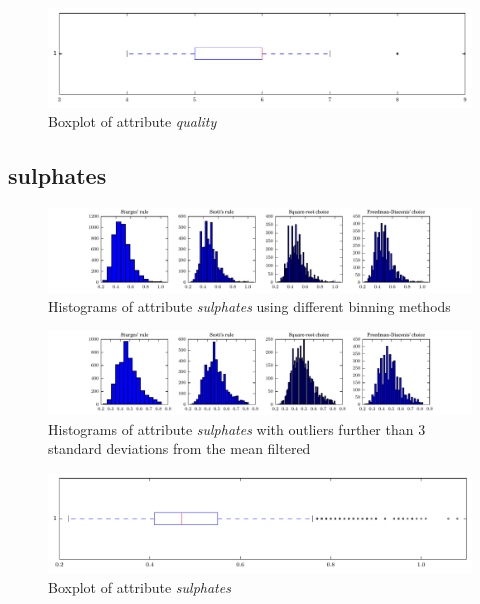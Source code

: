 \documentclass{report}
\begin{document}
\begin{figure}[H]
\includegraphics[width=\textwidth]{boxplots/quality.pdf}
\caption{Boxplot of attribute \emph{quality}}\end{figure}

\newpage\subsection{sulphates}
\begin{figure}[H]
\includegraphics[width=\textwidth]{histograms/sulphates.pdf}
\caption{Histograms of attribute \emph{sulphates} using different binning methods}\end{figure}

\begin{figure}[H]
\includegraphics[width=\textwidth]{histograms/sulphates_filtered.pdf}
\caption{Histograms of attribute \emph{sulphates} with outliers further than 3 standard deviations from the mean filtered}
\end{figure}

\begin{figure}[H]
\includegraphics[width=\textwidth]{boxplots/sulphates.pdf}
\caption{Boxplot of attribute \emph{sulphates}}\end{figure}
\end{document}

